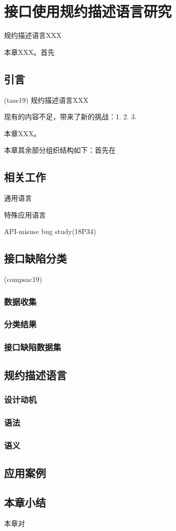 \chapter{接口使用规约描述语言研究}
\label{cha:impsec}
规约描述语言XXX

本章XXX。首先

\section{引言}
(tase19)
规约描述语言XXX

现有的内容不足，带来了新的挑战：1. 2. 3.

本章XXX。

本章其余部分组织结构如下：首先在

\section{相关工作}
通用语言

特殊应用语言

API-misuse bug study(18P34)

\section{接口缺陷分类}
(compsac19)
\subsection{数据收集}
\subsection{分类结果}
\subsection{接口缺陷数据集}

\section{规约描述语言}
\subsection{设计动机}
\subsection{语法}
\subsection{语义}

\section{应用案例}

\section{本章小结}
本章对